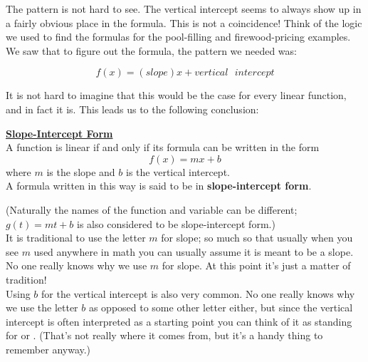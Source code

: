The pattern is not hard to see. The vertical intercept seems to always show up in a fairly obvious place in the formula. This is not a coincidence! Think of the logic we used to find the formulas for the pool-filling and firewood-pricing examples. We saw that to figure out the formula, the pattern we needed was:

\begin{equation*}
	f(x)=(slope)x+vertical \text{ } intercept
\end{equation*}

It is not hard to imagine that this would be the case for every linear function, and in fact it is. This leads us to the following conclusion:

\begin{definition}
	\textbf{\underline{Slope-Intercept Form}}\\
	\bigskip
	A function is linear if and only if its formula can be written in the form
	\begin{equation*}
		f(x)=mx+b
	\end{equation*}
	where $m$ is the slope and $b$ is the vertical intercept.\\
	A formula written in this way is said to be in \textbf{slope-intercept form}.
\end{definition}

(Naturally the names of the function and variable can be different; $g(t)=mt+b$ is also considered to be slope-intercept form.)\\

It is traditional to use the letter $m$ for slope; so much so that usually when you see $m$ used anywhere in math you can usually assume it is meant to be a slope. No one really knows why we use $m$ for slope. At this point it’s just a matter of tradition!\\

Using $b$ for the vertical intercept is also very common. No one really knows why we use the letter $b$ as opposed to some other letter either, but since the vertical intercept is often interpreted as a starting point you can think of it as standing for  or . (That’s not really where it comes from, but it’s a handy thing to remember anyway.)



